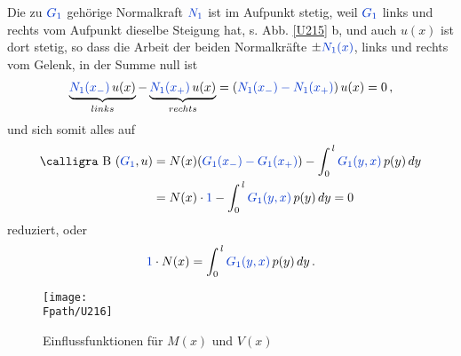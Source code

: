 Die zu $\textcolor{chapterTitleBlue}{G_1}$ geh\"{o}rige Normalkraft $\textcolor{chapterTitleBlue}{N_1}$ ist im Aufpunkt stetig, weil $\textcolor{chapterTitleBlue}{G_1} $ links und rechts vom Aufpunkt dieselbe Steigung hat, s. Abb. \ref{U215} b, und  auch $u(x)$ ist dort stetig, so dass die Arbeit der beiden Normalkr\"{a}fte $\pm \textcolor{chapterTitleBlue}{N_1(x)}$, links und rechts vom Gelenk, in der Summe null ist
\begin{align}
\underbrace{\textcolor{chapterTitleBlue}{N_1(x_{-})}\,u(x)}_{links} - \underbrace{\textcolor{chapterTitleBlue}{N_1(x_{+})}\,u(x)}_{rechts} = (\textcolor{chapterTitleBlue}{N_1(x_{-}) - N_1(x_{+})})\,u(x) = 0\,,
\end{align}
und sich somit alles auf
\begin{align}\label{Eq6}
\text{\normalfont\calligra B\,\,}(\textcolor{chapterTitleBlue}{G_1},u ) &= N(x) (\textcolor{chapterTitleBlue}{G_1(x_{-}) - G_1(x_+)}) - \int_0^{\,l} \textcolor{chapterTitleBlue}{G_1(y,x)}\,p(y)\,dy\nn \\
&= N(x) \cdot \textcolor{chapterTitleBlue}{1} - \int_0^{\,l}\textcolor{chapterTitleBlue}{ G_1(y,x)}\,p(y)\,dy = 0
\end{align}
reduziert, oder
\begin{align}
\textcolor{chapterTitleBlue}{1} \cdot N(x) = \int_0^{\,l} \textcolor{chapterTitleBlue}{G_1(y,x)}\,p(y)\,dy\,.
\end{align}
\begin{figure}[tbp]
\centering
\if {} \sidecaption \fi
\texttt{[image: \\Fpath/U216]}
\caption{Einflussfunktionen f\"{u}r $M(x)$ und $V(x)$} \label{U216}
\end{figure}%

